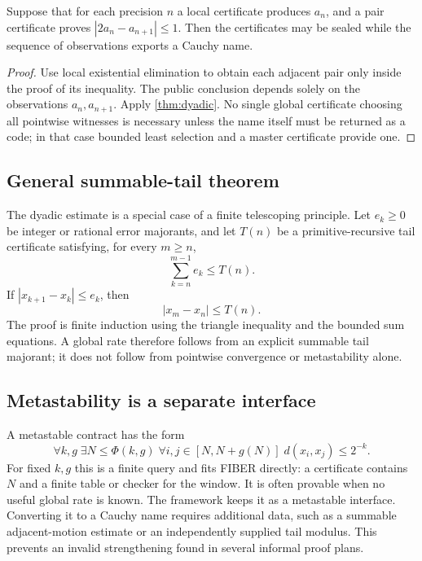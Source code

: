 \begin{corollary}
Suppose that for each precision \(n\) a local certificate produces \(a_n\), and
a pair certificate proves \(|2a_n-a_{n+1}|\le 1\).  Then the certificates may
be sealed while the sequence of observations exports a Cauchy name.
\end{corollary}

\begin{proof}
Use local existential elimination to obtain each adjacent pair only inside the
proof of its inequality.  The public conclusion depends solely on the
observations \(a_n,a_{n+1}\).  Apply \cref{thm:dyadic}.  No single global
certificate choosing all pointwise witnesses is necessary unless the name
itself must be returned as a code; in that case bounded least selection and a
master certificate provide one.
\end{proof}

\subsection{General summable-tail theorem}

The dyadic estimate is a special case of a finite telescoping principle.
Let \(e_k\ge0\) be integer or rational error majorants, and let \(T(n)\) be a
primitive-recursive tail certificate satisfying, for every \(m\ge n\),
\[
        \sum_{k=n}^{m-1}e_k\le T(n).
\]
If \(|x_{k+1}-x_k|\le e_k\), then
\[
        |x_m-x_n|\le T(n).
\]
The proof is finite induction using the triangle inequality and the bounded
sum equations.  A global rate therefore follows from an explicit summable
tail majorant; it does not follow from pointwise convergence or metastability
alone.

\subsection{Metastability is a separate interface}

A metastable contract has the form
\[
 \forall k,g\;\exists N\le\Phi(k,g)\;
 \forall i,j\in[N,N+g(N)]\;d(x_i,x_j)\le2^{-k}.
\]
For fixed \(k,g\) this is a finite query and fits FIBER directly: a certificate
contains \(N\) and a finite table or checker for the window.  It is often
provable when no useful global rate is known.  The framework keeps it as a
metastable interface.  Converting it to a Cauchy name requires additional
data, such as a summable adjacent-motion estimate or an independently supplied
tail modulus.  This prevents an invalid strengthening found in several
informal proof plans.

